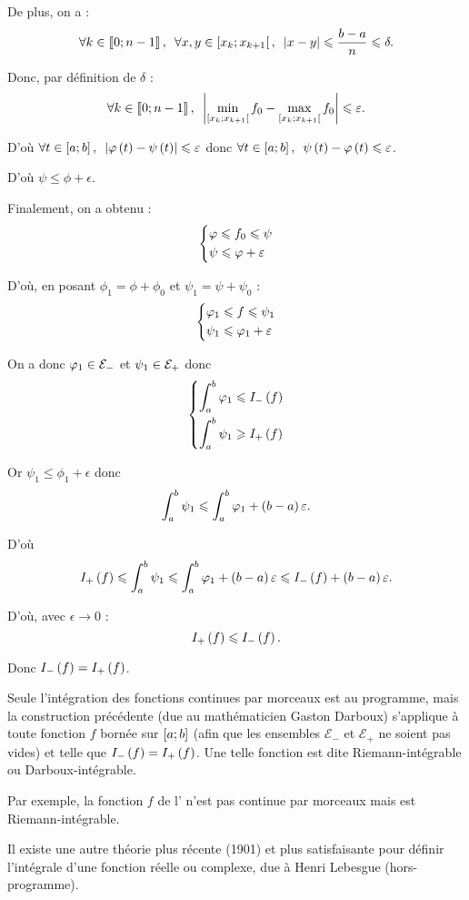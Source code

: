 \begin{dem}
De plus, on a : \[\quantifs{\forall k\in\interventierii{0}{n-1};\forall x,y\in\intervie{x_k}{x_{k+1}}}\abs{x-y}\leq\dfrac{b-a}{n}\leq\delta.\]

Donc, par définition de \(\delta\) : \[\quantifs{\forall k\in\interventierii{0}{n-1}}\abs{\min_{\intervie{x_k}{x_{k+1}}}f_0-\max_{\intervie{x_k}{x_{k+1}}}f_0}\leq\epsilon.\]

D'où \(\quantifs{\forall t\in\intervii{a}{b}}\abs{\phi\paren{t}-\psi\paren{t}}\leq\epsilon\) donc \(\quantifs{\forall t\in\intervii{a}{b}}\psi\paren{t}-\phi\paren{t}\leq\epsilon\).

D'où \(\psi\leq\phi+\epsilon\).

Finalement, on a obtenu : \[\begin{dcases}\phi\leq f_0\leq\psi \\ \psi\leq\phi+\epsilon\end{dcases}\]

D'où, en posant \(\phi_1=\phi+\phi_0\) et \(\psi_1=\psi+\psi_0\) : \[\begin{dcases}\phi_1\leq f\leq\psi_1 \\ \psi_1\leq\phi_1+\epsilon\end{dcases}\]

On a donc \(\phi_1\in\Em\) et \(\psi_1\in\Ep\) donc \[\begin{dcases}\int_a^b\phi_1\leq I_-\paren{f} \\ \int_a^b\psi_1\geq I_+\paren{f}\end{dcases}\]

Or \(\psi_1\leq\phi_1+\epsilon\) donc \[\int_a^b\psi_1\leq\int_a^b\phi_1+\paren{b-a}\epsilon.\]

D'où \[I_+\paren{f}\leq\int_a^b\psi_1\leq\int_a^b\phi_1+\paren{b-a}\epsilon\leq I_-\paren{f}+\paren{b-a}\epsilon.\]

D'où, avec \(\epsilon\to0\) : \[I_+\paren{f}\leq I_-\paren{f}.\]

Donc \(I_-\paren{f}=I_+\paren{f}\).
\end{dem}

\begin{rem}
\newcommand{\Em}{\mathcal{E}_-}
\newcommand{\Ep}{\mathcal{E}_+}
Seule l'intégration des fonctions continues par morceaux est au programme, mais la construction précédente (due au mathématicien Gaston Darboux) s'applique à toute fonction \(f\) bornée sur \(\intervii{a}{b}\) (afin que les ensembles \(\Em\) et \(\Ep\) ne soient pas vides) et telle que \(I_-\paren{f}=I_+\paren{f}\). Une telle fonction est dite Riemann-intégrable ou Darboux-intégrable.

Par exemple, la fonction \(f\) de l' n'est pas continue par morceaux mais est Riemann-intégrable.

Il existe une autre théorie plus récente (1901) et plus satisfaisante pour définir l'intégrale d'une fonction réelle ou complexe, due à Henri Lebesgue (hors-programme).
\end{rem}

